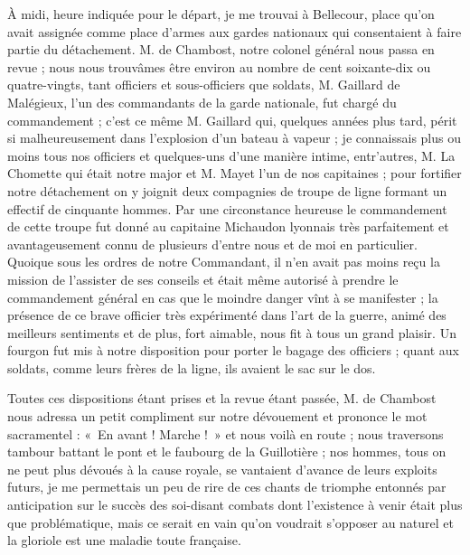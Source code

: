 \documentclass[11pt,a4paper]{report}
\begin{document}
À midi, heure indiquée pour le départ, je me trouvai à Bellecour, place qu'on avait assignée comme place d'armes aux gardes nationaux qui consentaient à faire partie du détachement. M. de Chambost, notre colonel général nous passa en revue ; nous nous trouvâmes être environ au nombre de cent soixante-dix ou quatre-vingts, tant officiers et sous-officiers que soldats, M. Gaillard de Malégieux, l'un des commandants de la garde nationale, fut chargé du commandement ; c'est ce même M. Gaillard qui, quelques années plus tard, périt si malheureusement dans l'explosion d'un bateau à vapeur ; je connaissais plus ou moins tous nos officiers et quelques-uns d'une manière intime, entr'autres, M. La Chomette qui était notre major et M. Mayet l'un de nos capitaines ; pour fortifier notre détachement on y joignit deux compagnies de troupe de ligne formant un effectif de cinquante hommes. Par une circonstance heureuse le commandement de cette troupe fut donné au capitaine Michaudon lyonnais très parfaitement et avantageusement connu de plusieurs d'entre nous et de moi en particulier. Quoique sous les ordres de notre Commandant, il n'en avait pas moins reçu la mission de l'assister de ses conseils et était même autorisé à prendre le commandement général en cas que le moindre danger vînt à se manifester ; la présence de ce brave officier très expérimenté dans l'art de la guerre, animé des meilleurs sentiments et de plus, fort aimable, nous fit à tous un grand plaisir. Un fourgon fut mis à notre disposition pour porter le bagage des officiers ; quant aux soldats, comme leurs frères de la ligne, ils avaient le sac sur le dos.

Toutes ces dispositions étant prises et la revue étant passée, M. de Chambost nous adressa un petit compliment sur notre dévouement et prononce le mot sacramentel : «~En avant ! Marche !~» et nous voilà en route ; nous traversons tambour battant le pont et le faubourg de la Guillotière ; nos hommes, tous on ne peut plus dévoués à la cause royale, se vantaient d'avance de leurs exploits futurs, je me permettais un peu de rire de ces chants de triomphe entonnés par anticipation sur le succès des soi-disant combats dont l'existence à venir était plus que problématique, mais ce serait en vain qu'on voudrait s'opposer au naturel et la gloriole est une maladie toute française.
\end{document}
